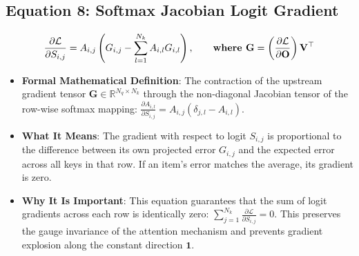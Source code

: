 \documentclass[11pt,a4paper]{article}
\theoremstyle{definition}
\begin{document}
\subsection{\textbf{Equation 8: Softmax Jacobian Logit Gradient}}
{\boldmath
\begin{equation}
\frac{\partial \mathcal{L}}{\partial S_{i, j}} = A_{i, j} \left( G_{i, j} - \sum_{l=1}^{N_k} A_{i, l} G_{i, l} \right), \qquad \text{\textbf{where }} \mathbf{G} = \left(\frac{\partial \mathcal{L}}{\partial \mathbf{O}}\right) \mathbf{V}^\top
\end{equation}
}
\begin{itemize}
    \item \textbf{Formal Mathematical Definition}:
    The contraction of the upstream gradient tensor $\mathbf{G} \in \mathbb{R}^{N_q \times N_k}$ through the non-diagonal Jacobian tensor of the row-wise softmax mapping: $\frac{\partial A_{i, l}}{\partial S_{i, j}} = A_{i, j}(\delta_{j, l} - A_{i, l})$.
    \item \textbf{What It Means}:
    The gradient with respect to logit $S_{i, j}$ is proportional to the difference between its own projected error $G_{i, j}$ and the expected error across all keys in that row. If an item's error matches the average, its gradient is zero.
    \item \textbf{Why It Is Important}:
    This equation guarantees that the sum of logit gradients across each row is identically zero: $\sum_{j=1}^{N_k} \frac{\partial \mathcal{L}}{\partial S_{i, j}} = 0$. This preserves the gauge invariance of the attention mechanism and prevents gradient explosion along the constant direction $\mathbf{1}$.
\end{itemize}
\end{document}
